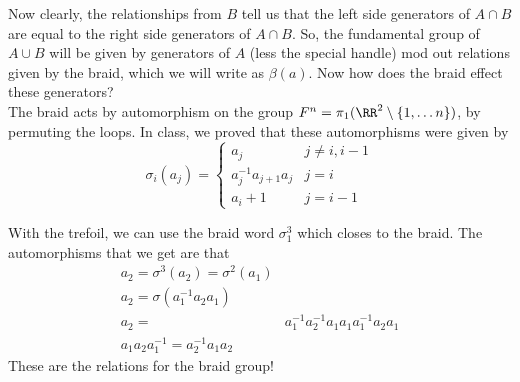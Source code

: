 Now clearly, the relationships from $B$ tell us that the left side generators of $A\cap B$ are equal to the right side generators of $A\cap B$. So, the fundamental group of $A\cup B$ will be given by generators of $A$ (less the special handle) mod out relations given by the braid, which we will write as $\beta(a)$. Now how does the braid effect these generators? \\
The braid acts by automorphism on the group $F^n=\pi_1(\RR^2\setminus \{1, \ldots n\})$, by permuting the loops. In class, we proved that these automorphisms were given by 
\[\sigma_i(a_j)=\left\{\begin{array}{cc} a_j & j\neq i,i-1\\
a_j^{-1}a_{j+1}a_j & j=i\\
a_i+1 & j=i-1
\end{array}\right.
\]
\begin{example}
With the trefoil, we can use the braid word $\sigma_1^3$ which closes to the braid. The automorphisms that we get are that 
\begin{align*}
a_2=\sigma^{3}(a_2)=\sigma^2(a_1)\\
a_2=\sigma(a_1^{-1} a_2 a_1)\\
a_2=& a_1^{-1} a_2^{-1} a_1 a_1 a_1^{-1} a_2 a_1\\
a_1 a_2 a_1^{-1}= a_2^{-1} a_1 a_2
\end{align*}
These are the relations for the braid group! 
\end{example}
